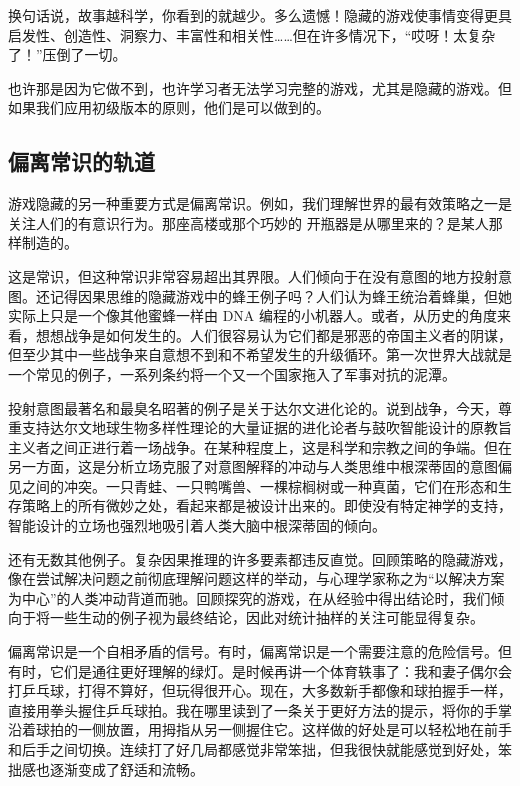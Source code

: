 换句话说，故事越科学，你看到的就越少。多么遗憾！隐藏的游戏使事情变得更具启发性、创造性、洞察力、丰富性和相关性……但在许多情况下，“哎呀！太复杂了！”压倒了一切。

也许那是因为它做不到，也许学习者无法学习完整的游戏，尤其是隐藏的游戏。但如果我们应用初级版本的原则，他们是可以做到的。

\subsection*{偏离常识的轨道}

游戏隐藏的另一种重要方式是偏离常识。例如，我们理解世界的最有效策略之一是关注人们的有意识行为。那座高楼或那个巧妙的
开瓶器是从哪里来的？是某人那样制造的。

这是常识，但这种常识非常容易超出其界限。人们倾向于在没有意图的地方投射意图。还记得因果思维的隐藏游戏中的蜂王例子吗？人们认为蜂王统治着蜂巢，但她实际上只是一个像其他蜜蜂一样由 DNA 编程的小机器人。或者，从历史的角度来看，想想战争是如何发生的。人们很容易认为它们都是邪恶的帝国主义者的阴谋，但至少其中一些战争来自意想不到和不希望发生的升级循环。第一次世界大战就是一个常见的例子，一系列条约将一个又一个国家拖入了军事对抗的泥潭。

投射意图最著名和最臭名昭著的例子是关于达尔文进化论的。说到战争，今天，尊重支持达尔文地球生物多样性理论的大量证据的进化论者与鼓吹智能设计的原教旨主义者之间正进行着一场战争。在某种程度上，这是科学和宗教之间的争端。但在另一方面，这是分析立场克服了对意图解释的冲动与人类思维中根深蒂固的意图偏见之间的冲突。一只青蛙、一只鸭嘴兽、一棵棕榈树或一种真菌，它们在形态和生存策略上的所有微妙之处，看起来都是被设计出来的。即使没有特定神学的支持，智能设计的立场也强烈地吸引着人类大脑中根深蒂固的倾向。

还有无数其他例子。复杂因果推理的许多要素都违反直觉。回顾策略的隐藏游戏，像在尝试解决问题之前彻底理解问题这样的举动，与心理学家称之为“以解决方案为中心”的人类冲动背道而驰。回顾探究的游戏，在从经验中得出结论时，我们倾向于将一些生动的例子视为最终结论，因此对统计抽样的关注可能显得复杂。

偏离常识是一个自相矛盾的信号。有时，偏离常识是一个需要注意的危险信号。但有时，它们是通往更好理解的绿灯。是时候再讲一个体育轶事了：我和妻子偶尔会打乒乓球，打得不算好，但玩得很开心。现在，大多数新手都像和球拍握手一样，直接用拳头握住乒乓球拍。我在哪里读到了一条关于更好方法的提示，将你的手掌沿着球拍的一侧放置，用拇指从另一侧握住它。这样做的好处是可以轻松地在前手和后手之间切换。连续打了好几局都感觉非常笨拙，但我很快就能感觉到好处，笨拙感也逐渐变成了舒适和流畅。


